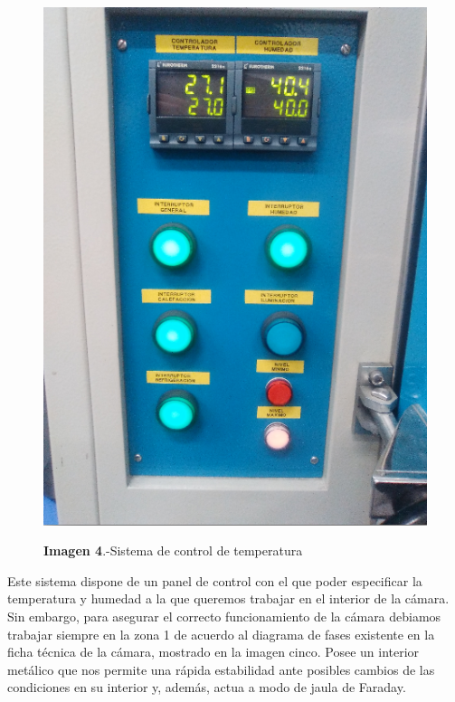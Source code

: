 \documentclass[11pt, a4paper]{article}
\begin{document}
\begin{itemize}
\begin{figure}[htb]
{\includegraphics[scale=0.15]{PanelTemperatura.png} 
}
\caption{\textbf{Imagen 4}.-Sistema de control de temperatura}
\end{figure}

Este sistema dispone de un panel de control con el que poder especificar la temperatura y humedad a la que queremos trabajar en el interior de la cámara. Sin embargo, para asegurar el correcto funcionamiento de la cámara debiamos trabajar siempre en la zona 1 de acuerdo al diagrama de fases existente en la ficha técnica de la cámara, mostrado en la imagen cinco. Posee un interior metálico que nos permite una rápida estabilidad ante posibles cambios de las condiciones en su interior y, además, actua a modo de jaula de Faraday. 


\end{itemize}
\end{document}
